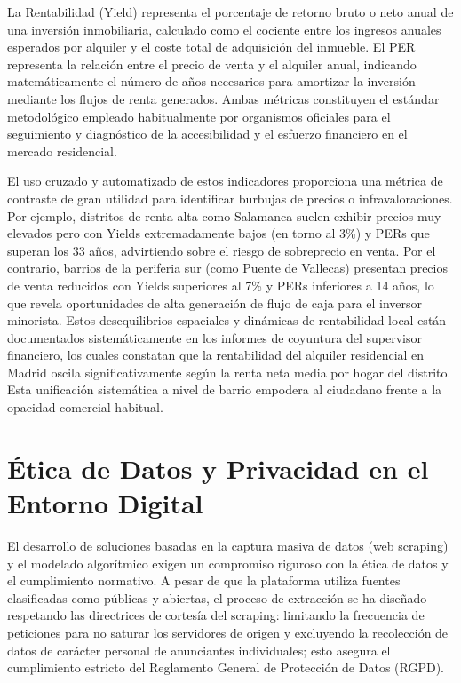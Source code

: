 \documentclass[a4paper,11pt,openany]{book}
\begin{document}
La Rentabilidad (Yield) representa el porcentaje de retorno bruto o neto anual de una inversión inmobiliaria, calculado como el cociente entre los ingresos anuales esperados por alquiler y el coste total de adquisición del inmueble. El PER representa la relación entre el precio de venta y el alquiler anual, indicando matemáticamente el número de años necesarios para amortizar la inversión mediante los flujos de renta generados. Ambas métricas constituyen el estándar metodológico empleado habitualmente por organismos oficiales para el seguimiento y diagnóstico de la accesibilidad y el esfuerzo financiero en el mercado residencial.

El uso cruzado y automatizado de estos indicadores proporciona una métrica de contraste de gran utilidad para identificar burbujas de precios o infravaloraciones. Por ejemplo, distritos de renta alta como Salamanca suelen exhibir precios muy elevados pero con Yields extremadamente bajos (en torno al 3\%) y PERs que superan los 33 años, advirtiendo sobre el riesgo de sobreprecio en venta. Por el contrario, barrios de la periferia sur (como Puente de Vallecas) presentan precios de venta reducidos con Yields superiores al 7\% y PERs inferiores a 14 años, lo que revela oportunidades de alta generación de flujo de caja para el inversor minorista. Estos desequilibrios espaciales y dinámicas de rentabilidad local están documentados sistemáticamente en los informes de coyuntura del supervisor financiero, los cuales constatan que la rentabilidad del alquiler residencial en Madrid oscila significativamente según la renta neta media por hogar del distrito. Esta unificación sistemática a nivel de barrio empodera al ciudadano frente a la opacidad comercial habitual.

\section{Ética de Datos y Privacidad en el Entorno Digital}
El desarrollo de soluciones basadas en la captura masiva de datos (web scraping) y el modelado algorítmico exigen un compromiso riguroso con la ética de datos y el cumplimiento normativo. A pesar de que la plataforma utiliza fuentes clasificadas como públicas y abiertas, el proceso de extracción se ha diseñado respetando las directrices de cortesía del scraping: limitando la frecuencia de peticiones para no saturar los servidores de origen y excluyendo la recolección de datos de carácter personal de anunciantes individuales; esto asegura el cumplimiento estricto del Reglamento General de Protección de Datos (RGPD).
\end{document}
